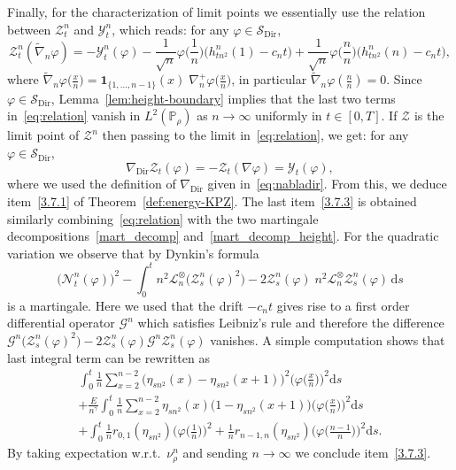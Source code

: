 \documentclass[10pt]{amsart}
\theoremstyle{definition}\newtheorem{defi}[theo]{Definition}\newtheorem{rema}[theo]{Remark}\newtheorem{exam}[theo]{Example}\newtheorem{exem}[theo]{Example}\newtheorem{nota}[theo]{Notation}
\DeclareMathOperator{\Dir}{Dir}
\newcommand{\bb}[1]{{\mathbb #1}}
\newcommand{\mc}[1]{{\mathcal #1}}
\renewcommand{\mc}[1]{{\mathcal #1}}
\newcommand{\SD}{\ensuremath{\mc S_{\Dir}}}
\renewcommand{\tilde}{\widetilde}
\newcommand*{\dd}{\mathrm{d}}
\newcommand*{\ds}{\dd s}
\renewcommand{\tfrac}{\frac}
\begin{document}
Finally, for the characterization of limit points we essentially use the relation between $\mc Z_t^n$ and $\mc Y_t^n$, which reads: for any $\varphi \in \SD$,
\begin{equation}\label{eq:relation}
\mc Z_t^n(\tilde\nabla_n\varphi) = -\mc Y_t^n(\varphi) - \frac{1}{\sqrt n}\varphi\Big(\frac1n\Big) \big(h_{tn^2}^n(1)-c_nt\big) + \frac{1}{\sqrt n}\varphi\Big(\frac n n\Big)\big(h_{tn^2}^n(n)-c_nt\big),
\end{equation}
where $\tilde\nabla_n\varphi(\frac x n\big)=\mathbf{1}_{\{1,\dots,n-1\}}(x)\;\nabla_n^+\varphi(\frac x n\big)$, in particular $\tilde\nabla_n\varphi(\frac n n)=0$. Since $\varphi \in \SD$, Lemma~\ref{lem:height-boundary} implies that the last two terms in~\eqref{eq:relation} vanish in $L^2(\bb P_\rho)$ as $n\to\infty$ uniformly in $t\in[0,T]$. If $\mc Z$ is the limit point of $\mc Z^n$ then passing to the limit in~\eqref{eq:relation}, we get: for any $\varphi \in \SD$,
\[
\nabla_{\Dir}\mc Z_t(\varphi) = - \mc Z_t(\nabla \varphi) = \mc Y_t(\varphi),
\]
where we used the definition of $\nabla_{\Dir}$ given in~\eqref{eq:nabladir}. From this, we deduce item~\eqref{3.7.1} of Theorem~\ref{def:energy-KPZ}. The last item~\eqref{3.7.3} is obtained similarly combining~\eqref{eq:relation} with the two martingale decompositions~\eqref{mart_decomp} and~\eqref{mart_decomp_height}. For the quadratic variation we observe that by Dynkin's formula
\begin{equation*}
\Big(\mc N_t^n(\varphi)\Big)^2-\int_0^t n^2\mc L_n^\otimes\big(\mc Z^n_s(\varphi)^2\big)-2\mc Z^n_s(\varphi)\; n^2\mc L_n^\otimes \mc Z^n_s(\varphi) \,\ds
\end{equation*}
is a martingale. Here we used that the drift $-c_n t$ gives rise to a first order differential operator $\mc G^n$ which satisfies Leibniz's rule and therefore the difference $\mc G^n\big(\mc Z^n_s(\varphi)^2\big)-2\mc Z^n_s(\varphi) \mc G^n \mc Z^n_s(\varphi) $ vanishes. A simple computation shows that last integral term can be rewritten as
\begin{multline*}
\int_0^t\frac{1}{n}\sum_{x=2}^{n-2} \big(\eta_{sn^2}(x)-\eta_{sn^2}(x+1)\big)^2 \Big(\varphi\Big(\tfrac{x}{n}\Big)\Big)^2\ds\\
+ \frac{E}{n^\gamma}\int_0^t \frac{1}{n} \sum_{x=2}^{n-2} \eta_{sn^2}(x)\big(1-\eta_{sn^2}(x+1)\big) \Big(\varphi\Big(\tfrac{x}{n}\Big)\Big)^2\ds\\
+ \int_0^t\frac{1}{n} r_{0,1}(\eta_{sn^2}) \Big(\varphi\Big(\tfrac{1}{n}\Big)\Big)^2+\frac{1}{n} r_{n-1,n}(\eta_{sn^2}) \Big(\varphi\Big(\tfrac{n-1}{n}\Big)\Big)^2\ds.
\end{multline*}
By taking expectation w.r.t.~$\nu_\rho^n$ and sending $n\to\infty$ we conclude item~\eqref{3.7.3}.
\end{document}
